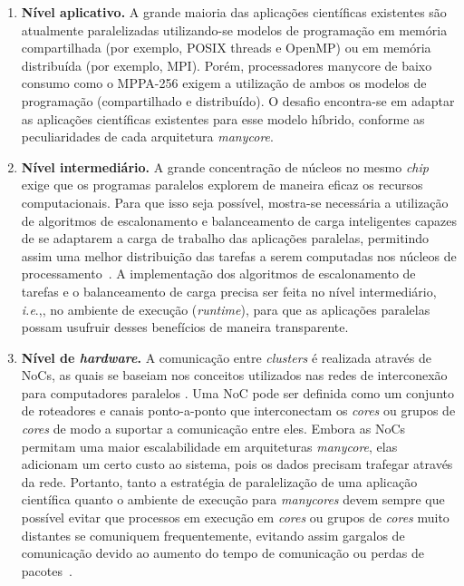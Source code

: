 \documentclass[a4paper,11pt]{article}
\newcommand{\ie}{\textit{i.e}.,\xspace}
\begin{document}
\begin{enumerate}

	\item \textbf{Nível aplicativo.} A grande maioria das aplicações científicas existentes são atualmente paralelizadas utilizando-se modelos de programação em memória compartilhada (por exemplo, POSIX threads e OpenMP) ou em memória distribuída (por exemplo, MPI). Porém, processadores manycore de baixo consumo como o MPPA-256 exigem a utilização de ambos os modelos de programação (compartilhado e distribuído). O desafio encontra-se em adaptar as aplicações científicas existentes para esse modelo híbrido, conforme as peculiaridades de cada arquitetura \emph{manycore}.
		
	\item \textbf{Nível intermediário.} A grande concentração de núcleos no mesmo \emph{chip} exige que os programas paralelos explorem de maneira eficaz os recursos computacionais. Para que isso seja possível, mostra-se necessária a utilização de algoritmos de escalonamento e balanceamento de carga inteligentes capazes de se adaptarem a carga de trabalho das aplicações paralelas, permitindo assim uma melhor distribuição das tarefas a serem computadas nos núcleos de processamento~\cite{penna:hal-01239916}. A implementação dos algoritmos de escalonamento de tarefas e o balanceamento de carga precisa ser feita no nível intermediário, \ie, no ambiente de execução (\emph{runtime}), para que as aplicações paralelas possam usufruir desses benefícios de maneira transparente.
	
	\item \textbf{Nível de \emph{hardware}.} A comunicação entre \emph{clusters} é realizada através de NoCs, as quais se baseiam nos conceitos utilizados nas redes de interconexão para computadores paralelos \cite{4586199}. Uma NoC pode ser definida como um conjunto de roteadores e canais ponto-a-ponto que interconectam os \emph{cores} ou grupos de \emph{cores} de modo a suportar a comunicação entre eles. Embora as NoCs permitam uma maior escalabilidade em arquiteturas \emph{manycore}, elas adicionam um certo custo ao sistema, pois os dados precisam trafegar através da rede. Portanto, tanto a estratégia de paralelização de uma aplicação científica quanto o ambiente de execução para \emph{manycores} devem sempre que possível evitar que processos em execução em \emph{cores} ou grupos de \emph{cores} muito distantes se comuniquem frequentemente, evitando assim gargalos de comunicação devido ao aumento do tempo de comunicação ou perdas de pacotes~\cite{5452474, 6112995}. 
	
\end{enumerate}
\end{document}
